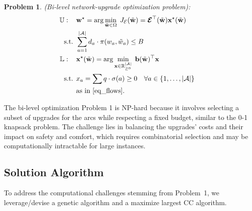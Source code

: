 \documentclass[letterpaper, 10 pt, conference]{ieeeconf}  %
\newtheorem{problem}{Problem}
\begin{document}
\begin{problem}\textit{(Bi-level network-upgrade optimization problem):} 
\label{utilitarian_problem}
\begin{align}
\mathbb{U}: \quad  \, &  \mathbf{w}^{\star}  = \arg\min_{\tilde{\mathbf{w}} \in \Omega} \;  J_{\mathcal{E}} (\tilde{\mathbf{w}})  = \boldsymbol{\mathcal{E}}^\top(\tilde{\mathbf{w}}) \mathbf{x}^\star(\tilde{\mathbf{w}})\\
\text{s.t. } & \sum_{a=1}^{|\mathcal{A}|} d_{a} \cdot \pi(w_{a},\tilde{w}_{a}) \leq B \label{budget_constraint} \\
\mathbb{L}: \quad \, & \mathbf{x}^\star(\tilde{\mathbf{w}}) = \arg\min_{\mathbf{x} \in \mathbb{R}^{|\mathcal{A}|}_{\geq 0}} \; \mathbf{b}(\tilde{\mathbf{w}})^\top \mathbf{x} \label{eq_utilitarian_obj} \\
\text{s.t. }  & x_a = \sum q \cdot \sigma(a) \geq 0  \quad \forall a \in \left \{ 1,\dots, |\mathcal{A}| \right   \}  \label{eq_utilitarian_constraints} \\
& \text{as in \eqref{eq_flows}}. \nonumber
\end{align}
\end{problem}
The bi-level optimization Problem 1 is NP-hard because it involves selecting a subset of upgrades for the arcs while respecting a fixed budget, similar to the 0-1 knapsack problem. The challenge lies in balancing the upgrades' costs and their impact on safety and comfort, which requires combinatorial selection and may be computationally intractable for large instances.

\subsection{Solution Algorithm}
To address the computational challenges stemming from Problem~1, we leverage/devise a genetic algorithm and a maximize largest CC algorithm.
\end{document}
